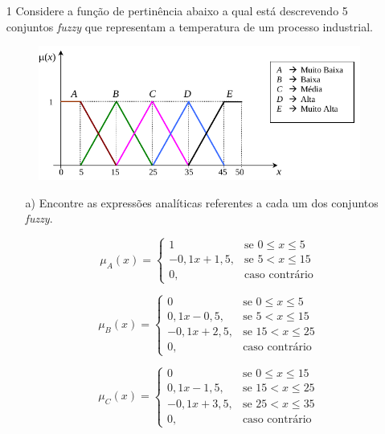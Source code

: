 \documentclass{report}
\begin{document}
\newpage

\begin{enumerate}

\item[1]  Considere a função de pertinência abaixo a qual está descrevendo 5 conjuntos \emph{fuzzy} que
representam a temperatura de um processo industrial.

\begin{figure}[hptb]
\centering
\includegraphics[scale=1]{plot1.png}
\end{figure}


\begin{enumerate}

\item[a)] Encontre as expressões analíticas referentes a cada um dos conjuntos \emph{fuzzy}.

\begin{equation*}
\mu_A (x) = 
\begin{cases} 
1           & \text{se $0 \leq x \leq 5$}
\\
-0,1x+1,5,  & \text{se $5 < x  \leq 15$}
\\
0,          & \text{caso contrário}
\end{cases}
\end{equation*}

\begin{equation*}
\mu_B (x) = 
\begin{cases} 
0           & \text{se $0 \leq x \leq 5$}
\\
0,1x-0,5,  & \text{se $5 < x  \leq 15$}
\\
-0,1x+2,5,  & \text{se $15 < x  \leq 25$}
\\
0,          & \text{caso contrário}
\end{cases}
\end{equation*}

\begin{equation*}
\mu_C (x) = 
\begin{cases} 
0           & \text{se $0 \leq x \leq 15$}
\\
0,1x-1,5,  & \text{se $15 < x  \leq 25$}
\\
-0,1x+3,5,  & \text{se $25 < x  \leq 35$}
\\
0,          & \text{caso contrário}
\end{cases}
\end{equation*}


\end{enumerate}
\end{enumerate}
\end{document}
